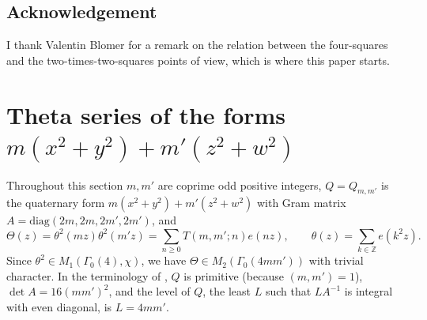 \documentclass[11pt]{amsart}
\theoremstyle{remark}
\newcommand{\Z}{\mathbb{Z}}
\begin{document}
\subsection*{Acknowledgement} I thank Valentin Blomer for a remark on the relation between the four-squares and the two-times-two-squares points of view, which is where this paper starts.

\section{Theta series of the forms $m(x^2+y^2)+m'(z^2+w^2)$}\label{sec:theta}

Throughout this section $m,m'$ are coprime odd positive integers, $Q=Q_{m,m'}$ is the quaternary form $m(x^2+y^2)+m'(z^2+w^2)$ with Gram matrix $A=\mathrm{diag}(2m,2m,2m',2m')$, and
\[
\Theta(z)=\theta^2(mz)\theta^2(m'z)=\sum_{n\ge0}T(m,m';n)e(nz),\qquad \theta(z)=\sum_{k\in\Z}e(k^2z).
\]
Since $\theta^2\in M_1(\Gamma_0(4),\chi)$, we have $\Theta\in M_2(\Gamma_0(4mm'))$ with trivial character. In the terminology of \cite{Waibel}, $Q$ is primitive (because $(m,m')=1$), $\det A=16(mm')^2$, and the level of $Q$, the least $L$ such that $LA^{-1}$ is integral with even diagonal, is $L=4mm'$.
\end{document}
